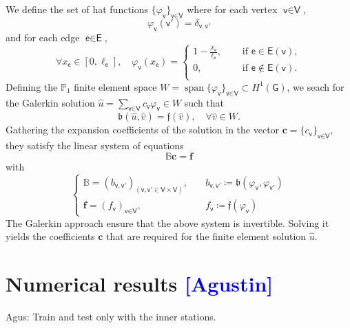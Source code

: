 \documentclass[11pt,a4paper,twoside]{article}
\theoremstyle{definition}
\numberwithin{equation}{section}
\newcommand{\bB}{\ensuremath{\mathbb{B}}}
\newcommand{\bP}{\ensuremath{\mathbb{P}}}
\newcommand{\G}{\ensuremath{\textsf{G}}} %
\newcommand{\E}{\ensuremath{\textsf{E}}} %
\newcommand{\V}{\ensuremath{\textsf{V}}} %
\newcommand{\vv}{\ensuremath{\textsf{v}}}
\newcommand{\ee}{\ensuremath{\textsf{e}}}
\newcommand{\<}{\langle}
\renewcommand{\>}{\rangle}
\newcommand{\vspan}{\operatorname{span}}
\newcommand{\ascomment}[1]{{\color{teal} Agus: #1}}
\newcommand{\om}[1]{\textcolor{blue}{#1}}
\begin{document}
We define the set of hat functions $\{\varphi_\vv\}_{\vv\in \V}$ where for each vertex $\vv\in \V$,
$$
\varphi_\vv( \vv') = \delta_{\vv, \vv'}
$$
and for each edge $\ee \in \E$,
\begin{equation}
\forall x_\ee \in [0, \ell_\ee],\quad
\varphi_\vv(x_\ee)=
\begin{cases}
1-\frac{x_\ee}{\ell_\ee}, \quad &\text{ if } \ee \in \E(\vv), \\
0 , \quad &\text{ if } \ee \not\in \E(\vv). \\
\end{cases}
\end{equation}
Defining the $\bP_1$ finite element space $W = \vspan\{\varphi_\vv\}_{\vv\in \V} \subset H^1(\G)$, we seach for the Galerkin solution $\hat u = \sum_{\vv\in \V} c_\vv \varphi_\vv \in W$ such that
$$
\mathfrak{b}(\hat u, \hat v) = \mathfrak{f} (\hat v), \quad \forall \hat v\in W.
$$
Gathering the expansion coefficients of the solution in the vector $\textbf{c} = \{c_\vv\}_{\vv\in \V}$, they satisfy the linear system of equations
$$
\bB\textbf{c} = \textbf{f}
$$
with
\begin{equation}
\begin{cases}
\bB = (b_{\vv, \vv'})_{(\vv,\vv'\in \V \times \V)}, \quad &b_{\vv, \vv'} \coloneqq \mathfrak{b}(\varphi_\vv, \varphi_{\vv'}) \\
\textbf{f} = (f_\vv)_{\vv\in \V}, \quad &f_\vv \coloneqq \mathfrak{f}(\varphi_\vv)
\end{cases}
\end{equation}
The Galerkin approach ensure that the above system is invertible. Solving it yields the coefficients $\textbf{c}$ that are required for the finite element solution $\hat u$.








\section{Numerical results \om{[Agustin]}}
\label{sec:numerical-tests}

\ascomment{Train and test only with the inner stations.}
\end{document}
